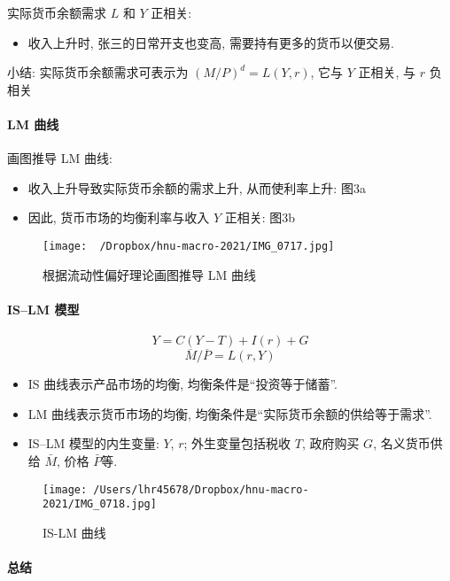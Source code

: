 \documentclass[11pt]{ctexart}
\begin{document}
\clearpage

实际货币余额需求 $L$ 和 $Y$ 正相关:
\begin{itemize}
\item
  收入上升时, 张三的日常开支也变高, 需要持有更多的货币以便交易.
\end{itemize}
小结: 实际货币余额需求可表示为 $(M/P)^d = L(Y,  r)$, 它与 $Y$ 正相关, 与 $r$ 负相关

\paragraph{LM 曲线}
画图推导 LM 曲线:

\begin{itemize}
\item
  收入上升导致实际货币余额的需求上升, 从而使利率上升: 图3a
\item
  因此,  货币市场的均衡利率与收入 $Y$ 正相关: 图3b
\end{itemize}

\begin{figure}[htbp]
\centering
\texttt{[image: ~/Dropbox/hnu-macro-2021/IMG\_0717.jpg]}
\caption{根据流动性偏好理论画图推导 LM 曲线}
\end{figure}

\paragraph{IS--LM 模型}

\[Y = C(Y-T) + I(r) + G \tag{IS}\]
\[{\overline{M} / \overline{P}} = L(r, Y) \tag{LM}\]
\begin{itemize}
\item
  IS 曲线表示产品市场的均衡,  均衡条件是``投资等于储蓄''. 
\item
  LM 曲线表示货币市场的均衡,  均衡条件是``实际货币余额的供给等于需求''.
\item
  IS--LM 模型的内生变量: $Y$,  $r$; 外生变量包括税收 $T$,  政府购买 $G$,  名义货币供给 $\bar{M}$,  价格 $\bar{P}$等.  
\end{itemize}

\begin{figure}[htbp]
\centering
\texttt{[image: /Users/lhr45678/Dropbox/hnu-macro-2021/IMG\_0718.jpg]}
\caption{IS-LM 曲线}
\label{fig:is-lm2}
\end{figure}

\paragraph{总结}
\end{document}
